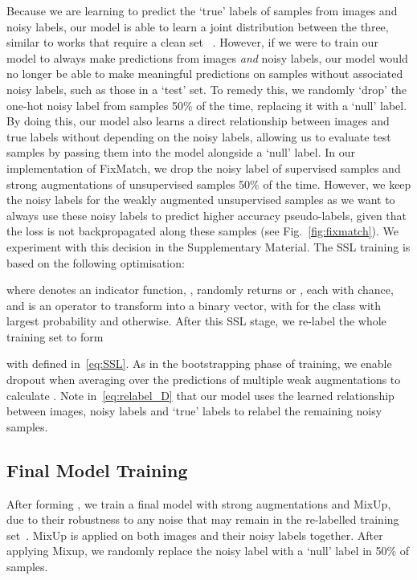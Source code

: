 \documentclass[10pt,twocolumn,letterpaper]{article}
\begin{document}
Because we are learning to predict the `true' labels of samples from images and noisy labels, our model is able to learn a joint distribution between the three, similar to works that require a clean set ~\cite{veit2017learning, inoue2017multi, gu2021instancedependent}. However, if we were to train our model to always make predictions from images \textit{and} noisy labels, our model would no longer be able to make meaningful predictions on samples without associated noisy labels, such as those in a `test' set. To remedy this, we randomly `drop' the one-hot noisy label from samples 50\% of the time, replacing it with a `null' label. By doing this, our model also learns a direct relationship between images and true labels without depending on the noisy labels, allowing us to evaluate test samples by passing them into the model alongside a `null' label. In our implementation of FixMatch, we drop the noisy label of supervised samples and strong augmentations of unsupervised samples 50\% of the time. However, we keep the noisy labels for the weakly augmented unsupervised samples as we want to always use these noisy labels to predict higher accuracy pseudo-labels, given that the loss is not backpropagated along these samples (see Fig.~\ref{fig:fixmatch}). We experiment with this decision in the Supplementary Material.
The SSL training is based on the following optimisation:

where  denotes an indicator function, , 
 randomly returns  or , each with  chance,
and 
 is an operator to transform  into a binary vector, with  for the class with largest probability and  otherwise.
After this SSL stage, we re-label the whole training set to form

with  defined in~\eqref{eq:SSL}. As in the bootstrapping phase of training, we enable dropout when averaging over the predictions of multiple weak augmentations to calculate . Note in~\eqref{eq:relabel_D} that our model uses the learned relationship between images, noisy labels and `true' labels to relabel the remaining noisy samples.

\subsection{Final Model Training}

After forming , we train a final model with strong augmentations and MixUp, due to their robustness to any noise that may remain in the re-labelled training set~\cite{arazo2019unsupervised, li2020dividemix}. MixUp is applied on both images and their noisy labels together. After applying Mixup, we randomly replace the noisy label with a `null' label in 50\% of samples.
\end{document}
